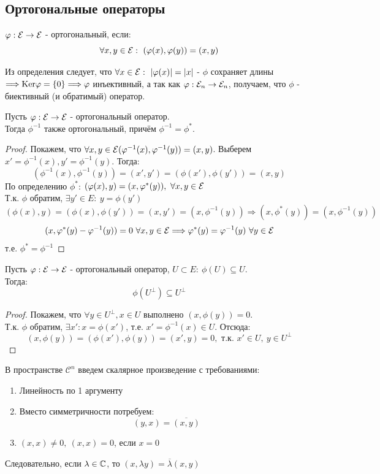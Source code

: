 \subsection{Ортогональные операторы}
\begin{definition}
    $\phi: \E \rightarrow \E$ - ортогональный, если: 
    $$\forall x,y \in \E: \ (\phi(x), \phi(y)) = (x, y)$$ 
\end{definition}
Из определения следует, что $\forall x \in \E: \ |\phi(x)| = |x|$ - $\phi$ сохраняет длины $\Longrightarrow \textup{Ker}\phi = \{0\} \Longrightarrow \phi$ инъективный, а так как $\phi: \E_n \rightarrow \E_n$, получаем, что $\phi$ - биективный (и обратимый) оператор.  
\begin{subtheorem}
    Пусть $\phi: \E \rightarrow \E$ - ортогональный оператор.\\
    Тогда $\phi^{-1}$ также ортогональный, причём $\phi^{-1} = \phi^*$.
\end{subtheorem}
\begin{proof}
    Покажем, что $\forall x,y \in \E (\phi^{-1}(x), \phi^{-1}(y)) = (x, y)$. Выберем $x' = \phi^{-1}(x), y' = \phi^{-1}(y)$. Тогда:
    $$(\phi^{-1}(x), \phi^{-1}(y)) = (x', y') = (\phi(x'), \phi(y')) = (x, y)$$
    По определению $\phi^*$: $(\phi(x), y) = (x,\phi^*(y)), \ \forall x, y \in \E$\\
    Т.к. $\phi$ обратим, $\exists y' \in E: \ y = \phi(y')$
    $$(\phi(x), y) = (\phi(x), \phi(y')) = (x, y') = (x, \phi^{-1}(y)) \Longrightarrow (x, \phi^*(y)) = (x, \phi^{-1}(y))$$
    $$(x, \phi^*(y) - \phi^{-1}(y)) = 0 \ \forall x,y \in \E \Longrightarrow \phi^*(y) = \phi^{-1}(y) \ \forall y \in \E$$
    т.е. $\phi^* = \phi^{-1}$
\end{proof}
\begin{lemma}
    Пусть $\phi: \E \rightarrow \E$ - ортогональный оператор, $U \subset E: \ \phi(U) \subseteq U$.\\
    Тогда: $$\phi(U^\perp) \subseteq U^\perp$$
\end{lemma}
\begin{proof}
    Покажем, что $\forall y \in U^\perp, x \in U$ выполнено $(x, \phi(y)) = 0$.\\
    Т.к. $\phi$ обратим, $\exists x': x = \phi(x')$, т.е. $x' = \phi^{-1}(x) \in U$. Отсюда:
    $$(x, \phi(y)) = (\phi(x'), \phi(y)) = (x', y) = 0, \text{ т.к. } x' \in U, \ y \in U^\perp$$
\end{proof}
\begin{definition}
    В пространстве $\mathcal{C}^n$ введем скалярное произведение с требованиями:
\begin{enumerate}
    \item Линейность по 1 аргументу
    \item Вместо симметричности потребуем:
    $$(y,x) = \overline{(x,y)}$$
    \item $(x,x) \neq 0, \ (x,x) = 0$, если $x=0$   
\end{enumerate}
Следовательно, если $\lambda \in \CC$, то $(x,\lambda y) = \overline{\lambda}(x,y)$ 
\end{definition}
